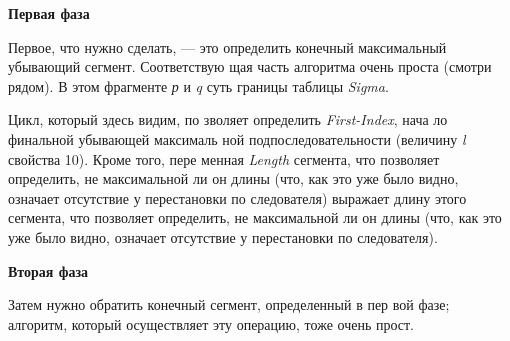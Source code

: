{\noindent \textbf{\large{Первая фаза}}

Первое, что нужно сделать, — это 
определить  конечный  максимальный 
убывающий  сегмент.  Соответствую­
щая  часть  алгоритма  очень  проста 
(смотри рядом). В этом фрагменте \textit{р} и \textit{q}
 суть границы таблицы \textit{Sigma}.
 
Цикл,  который  здесь  видим,  по­
зволяет определить \textit{First-Index}, нача­
ло финальной убывающей максималь­
ной  подпоследовательности  (величи­ну \textit{l}
  свойства  10).  Кроме того, пере­
менная \textit{Length}
сегмента,  что  позволяет  определить,  не  максимальной  ли  он  длины 
(что, как это уже было видно, означает отсутствие у перестановки по­
следователя)
 выражает длину этого сегмента,  что  позволяет  определить,  не  максимальной  ли  он  длины 
(что, как это уже было видно, означает отсутствие у перестановки по­
следователя).

\noindent \textbf{\large{Вторая фаза}}

Затем  нужно  обратить  конечный  сегмент,  определенный  в  пер­
вой фазе; алгоритм, который осуществляет эту операцию, тоже очень 
прост.

}
